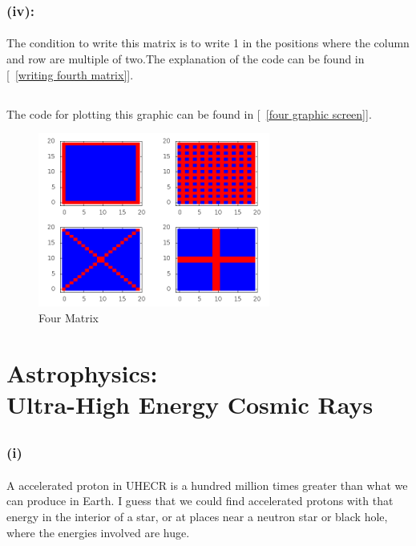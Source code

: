 \documentclass[twocolumn]{article}
\begin{document}
\subsubsection{(iv):}
\paragraph{}
The condition to write this matrix is to write 1 in the positions where the column and row are multiple of two.The explanation of the code can be found in [~\ref{writing fourth matrix}].
\subsection{}
The code for plotting this graphic can be found in [~\ref{four graphic screen}].

\begin{figure}[h!]
\begin{center}
\includegraphics[width=3in]{fig2.png}
\caption{Four Matrix}
\label{Four Matrix}
\end{center}
\end{figure}
\section{Astrophysics:\\Ultra-High Energy Cosmic Rays}

\subsection{}
\subsubsection{(i)}
\paragraph{}
A accelerated proton in UHECR is a hundred million times greater than what we can produce in Earth.
I guess that we could find accelerated protons with that energy in the interior of a star, or at places near a neutron star or black hole, where the energies involved are huge.
\end{document}
